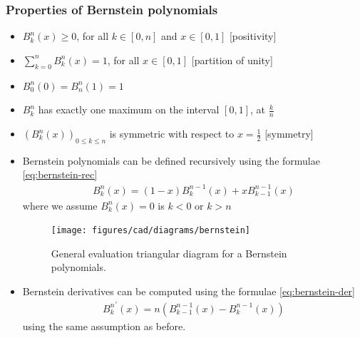 \subsubsection*{Properties of Bernstein polynomials}
\begin{itemize}
  \item $B_k^n(x) \ge 0$, for all $k \in \left[0, n \right]$ and $x \in \left[ 0, 1 \right]$ \hfill [positivity] 
  \item $\sum_{k=0}^n B_k^n(x) = 1$, for all $x \in \left[ 0, 1 \right]$ \hfill [partition of unity] 
  \item $B_0^n(0) = B_n^n(1) = 1$ 
  \item $B_k^n$ has exactly one maximum on the interval $\left[ 0, 1 \right]$, at $\frac{k}{n}$ 
  \item $\left( B_k^n(x) \right)_{0 \le k \le n}$ is symmetric with respect to $x = \frac{1}{2}$ \hfill [symmetry]
  \item Bernstein polynomials can be defined recursively using the formulae \ref{eq:bernstein-rec}
    \begin{align}
      B_k^n(x) = (1-x) B_k^{n-1}(x) + x B_{k-1}^{n-1}(x)
      \label{eq:bernstein-rec}
    \end{align}
    where we assume $B_k^n(x) = 0$ is $k < 0$ or $k > n$

    \begin{figure}
    \centering
    \texttt{[image: figures/cad/diagrams/bernstein]}
    \caption{General evaluation triangular diagram for a Bernstein polynomials.}
    \label{fig:bernstein-triangular-diagram}
    \end{figure}

  \item Bernstein derivatives can be computed using the formulae \ref{eq:bernstein-der} 
    \begin{align}
      {B_k^n}^\prime(x) = n \left(B_{k-1}^{n-1}(x) - B_k^{n-1}(x) \right)
      \label{eq:bernstein-der}
    \end{align}
    using the same assumption as before.
\end{itemize}

